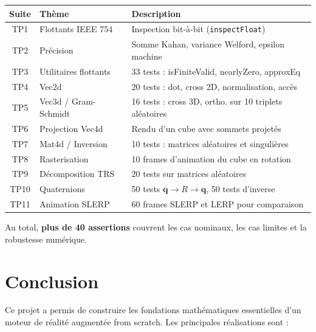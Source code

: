 \documentclass[11pt,a4paper]{article}
\begin{document}
\begin{center}
\renewcommand{\arraystretch}{1.4}
\begin{tabular}{cll}
\toprule
\textbf{Suite} & \textbf{Thème} & \textbf{Description} \\
\midrule
TP1  & Flottants IEEE 754        & Inspection bit-à-bit (\texttt{inspectFloat}) \\
TP2  & Précision                 & Somme Kahan, variance Welford, epsilon machine \\
TP3  & Utilitaires flottants     & 33 tests : isFiniteValid, nearlyZero, approxEq \\
TP4  & Vec2d                     & 20 tests : dot, cross 2D, normalisation, accès \\
TP5  & Vec3d / Gram-Schmidt      & 16 tests : cross 3D, ortho. sur 10 triplets aléatoires \\
TP6  & Projection Vec4d          & Rendu d'un cube avec sommets projetés \\
TP7  & Mat4d / Inversion         & 10 tests : matrices aléatoires et singulières \\
TP8  & Rasterisation             & 10 frames d'animation du cube en rotation \\
TP9  & Décomposition TRS         & 20 tests sur matrices aléatoires \\
TP10 & Quaternions               & 50 tests $\mathbf{q}\to R\to\mathbf{q}$, 50 tests d'inverse \\
TP11 & Animation SLERP           & 60 frames SLERP et LERP pour comparaison \\
\bottomrule
\end{tabular}
\end{center}

\vspace{0.5em}
Au total, \textbf{plus de 40 assertions} couvrent les cas nominaux, les cas limites et la robustesse numérique.

\newpage

\section{Conclusion}

Ce projet a permis de construire les fondations mathématiques essentielles d'un moteur de réalité augmentée from scratch. Les principales réalisations sont :
\end{document}
